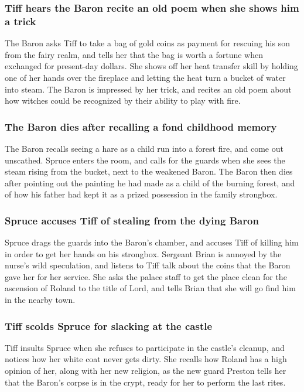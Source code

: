 \subsubsection{\Gls{Tiff} hears the \Gls{Baron} recite an old poem when she shows him a trick}
The \Gls{Baron} asks \Gls{Tiff} to take a bag of gold coins as payment for rescuing his son from
the fairy realm, and tells her that the bag is worth a fortune when exchanged for present-day
dollars. She shows off her heat transfer skill by holding one of her hands over the fireplace and
letting the heat turn a bucket of water into steam. The \Gls{Baron} is impressed by her trick, and
recites an old poem about how witches could be recognized by their ability to play with fire.

\subsubsection{The \Gls{Baron} dies after recalling a fond childhood memory}
The \Gls{Baron} recalls seeing a hare as a child run into a forest fire, and come out unscathed.
\Gls{Spruce} enters the room, and calls for the guards when she sees the steam rising from the
bucket, next to the weakened \Gls{Baron}. The \Gls{Baron} then dies after pointing out the painting
he had made as a child of the burning forest, and of how his father had kept it as a prized
possession in the family strongbox.

\subsubsection{\Gls{Spruce} accuses \Gls{Tiff} of stealing from the dying \Gls{Baron}}
\Gls{Spruce} drags the guards into the \Gls{Baron}'s chamber, and accuses \Gls{Tiff} of killing him
in order to get her hands on his strongbox. Sergeant \Gls{Brian} is annoyed by the nurse's wild
speculation, and listens to \Gls{Tiff} talk about the coins that the \Gls{Baron} gave her for her
service. She asks the palace staff to get the place clean for the ascension of \Gls{Roland} to the
title of Lord, and tells \Gls{Brian} that she will go find him in the nearby town.

\subsubsection{\Gls{Tiff} scolds \Gls{Spruce} for slacking at the castle}
\Gls{Tiff} insults \Gls{Spruce} when she refuses to participate in the castle's cleanup, and notices
how her white coat never gets dirty. She recalls how \Gls{Roland} has a high opinion of her, along
with her new religion, as the new guard \Gls{Preston} tells her that the \Gls{Baron}'s corpse is
in the crypt, ready for her to perform the last rites.

